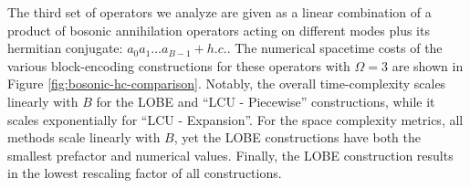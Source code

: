 The third set of operators we analyze are given as a linear combination of a product of bosonic annihilation operators acting on different modes plus its hermitian conjugate: $a_0 a_1 \hdots a_{B-1} + h.c.$.
The numerical spacetime costs of the various block-encoding constructions for these operators with $\Omega = 3$ are shown in Figure \ref{fig:bosonic-hc-comparison}.
Notably, the overall time-complexity scales linearly with $B$ for the LOBE and ``LCU - Piecewise'' constructions, while it scales exponentially for ``LCU - Expansion''.
For the space complexity metrics, all methods scale linearly with $B$, yet the LOBE constructions have both the smallest prefactor and numerical values.
Finally, the LOBE construction results in the lowest rescaling factor of all constructions.









